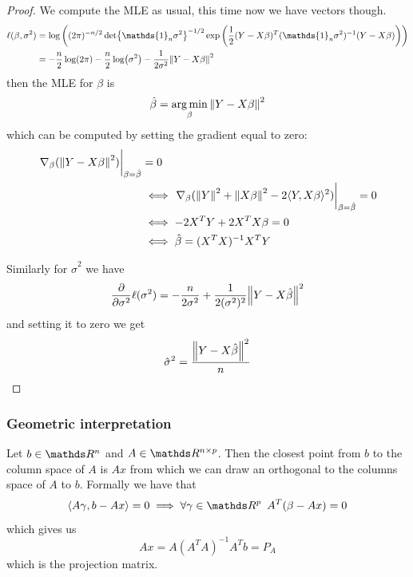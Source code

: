 \documentclass[12pt]{extarticle}
\begin{document}
\begin{proof}
    We compute the MLE as usual, this time now we have vectors though.
    \begin{align}
        \ell(\beta, \sigma^2) & = \log\left( (2\pi)^{-n/2} \det{\mathds{1}_n \sigma^2}^{-1/2} \exp\left( \frac{1}{2} (Y-X\beta)^T(\mathds{1}_n \sigma^2)^{-1}(Y - X \beta) \right) \right) \\
                              & = -\frac{n}{2} \log(2 \pi) - \frac{n}{2} \log(\sigma^2) - \frac{1}{2\sigma^2} \norm{Y - X \beta}^2
    \end{align}
    then the MLE for $\beta$ is
    \begin{equation}
        \hat \beta = \operatorname*{arg\,min}_{\beta} \norm{Y - X\beta}^2
    \end{equation}
    which can be computed by setting the gradient equal to zero:
    \begin{align}
        \eval{\nabla_\beta (\norm{Y - X\beta}^2)}_{\beta = \hat \beta} & = 0                                                                                                               \\
                                                                       & \iff \eval{\nabla_\beta (\norm{Y}^2 + \norm{X \beta}^2 - 2 \langle Y, X\beta \rangle^2)}_{\beta = \hat \beta} = 0 \\
                                                                       & \iff -2 X^T Y + 2 X^T X \beta = 0                                                                                 \\
                                                                       & \iff \hat \beta = (X^T X)^{-1} X^T Y
    \end{align}

    Similarly for $\hat \sigma^2$ we have
    \begin{equation}
        \pdv{\sigma^2} \ell(\sigma^2) = - \frac{n}{2\sigma^2} + \frac{1}{2 (\sigma^2)^2} \norm{Y - X \hat \beta}^2
    \end{equation}
    and setting it to zero we get
    \begin{equation}
        \hat \sigma^2 = \frac{\norm{Y- X \hat \beta}^2}{n}
    \end{equation}
\end{proof}

\subsubsection{Geometric interpretation}
Let $b \in \R^n$ and $A \in \R^{n \times p}$.
Then the closest point from $b$ to the column space of $A$ is $Ax$
from which we can draw an orthogonal to the columns space of $A$ to $b$.
Formally we have that
\begin{equation}
    \langle A\gamma , b - Ax \rangle = 0 \implies \forall \gamma \in \R^p \enspace A^T(\beta -Ax) = 0
\end{equation}
which gives us
\begin{equation}
    A x = A (A ^T A)^{-1} A^T b = P_A
\end{equation}
which is the projection matrix.
\end{document}
